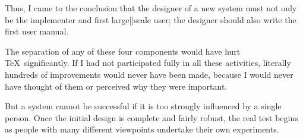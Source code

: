 Thus, I came to the conclusion that the designer of a new
system must not only be the implementer and first
large||scale user; the designer should also write the first
user manual.

The separation of any of these four components would have
hurt \TeX\ significantly. If I had not participated fully in
all these activities, literally hundreds of improvements
would never have been made, because I would never have
thought of them or perceived why they were important.

But a system cannot be successful if it is too strongly
influenced by a single person. Once the initial design is
complete and fairly robust, the real test begins as people
with many different viewpoints undertake their own
experiments. 
